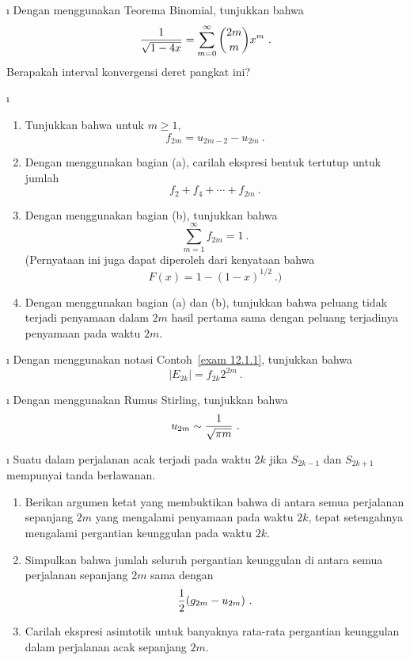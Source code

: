 \exercises
\begin{LJSItem}
 
\i\label{exer 12.1.1} Dengan menggunakan Teorema Binomial, tunjukkan bahwa
$${1\over{\sqrt {1 - 4x}}} = \sum_{m = 0}^\infty {2m \choose m} x^m\ .$$
Berapakah interval konvergensi deret pangkat ini?

\i\label{exer 12.1.2}
\begin{enumerate}

\item Tunjukkan bahwa untuk $m \ge 1$, 
$$f_{2m} = u_{2m-2} - u_{2m}\ .$$

\item Dengan menggunakan bagian (a), carilah ekspresi bentuk tertutup untuk jumlah
$$f_2 + f_4 + \cdots + f_{2m}\ .$$

\item Dengan menggunakan bagian (b), tunjukkan bahwa
$$\sum_{m = 1}^\infty f_{2m} = 1\ .$$
(Pernyataan ini juga dapat diperoleh dari kenyataan bahwa 
$$F(x) = 1 - (1-x)^{1/2}\ .)$$

\item Dengan menggunakan bagian (a) dan (b), tunjukkan bahwa peluang tidak
terjadi penyamaan dalam $2m$ hasil pertama sama dengan peluang terjadinya
penyamaan pada waktu $2m$.
\end{enumerate}

\i\label{exer 12.1.3} Dengan menggunakan notasi Contoh~\ref{exam 12.1.1},
tunjukkan bahwa
$$|E_{2k}| = f_{2k} 2^{2m}\ .$$

\i\label{exer 12.1.4} Dengan menggunakan Rumus Stirling, tunjukkan bahwa 
$$u_{2m} \sim {1\over{\sqrt {\pi m}}}\ .$$

\i\label{exer 12.1.5} Suatu  dalam perjalanan acak terjadi pada waktu $2k$ jika $S_{2k-1}$ dan
$S_{2k+1}$ mempunyai tanda berlawanan.  
\begin{enumerate}
\item Berikan argumen ketat yang membuktikan bahwa di antara semua perjalanan
sepanjang $2m$ yang mengalami penyamaan pada waktu $2k$, tepat setengahnya
mengalami pergantian keunggulan pada waktu $2k$.

\item Simpulkan bahwa jumlah seluruh pergantian keunggulan di antara semua
perjalanan sepanjang $2m$ sama dengan
$${1\over 2}(g_{2m} - u_{2m})\ .$$

\item Carilah ekspresi asimtotik untuk banyaknya rata-rata pergantian keunggulan
dalam perjalanan acak sepanjang $2m$. 
\end{enumerate}


\end{LJSItem}
